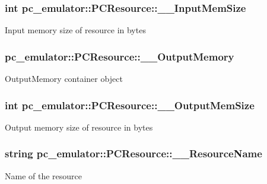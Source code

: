 \subsubsection[{\texorpdfstring{\+\_\+\+\_\+\+Input\+Mem\+Size}{__InputMemSize}}]{\setlength{\rightskip}{0pt plus 5cm}int pc\+\_\+emulator\+::\+P\+C\+Resource\+::\+\_\+\+\_\+\+Input\+Mem\+Size}\hypertarget{classpc__emulator_1_1PCResource_afb2356d0dcf4db0b6a04302861a26f18}{}\label{classpc__emulator_1_1PCResource_afb2356d0dcf4db0b6a04302861a26f18}
Input memory size of resource in bytes 
\subsubsection[{\texorpdfstring{\+\_\+\+\_\+\+Output\+Memory}{__OutputMemory}}]{ pc\+\_\+emulator\+::\+P\+C\+Resource\+::\+\_\+\+\_\+\+Output\+Memory}\hypertarget{classpc__emulator_1_1PCResource_aa70b08417c498d378158b048915ff8c0}{}\label{classpc__emulator_1_1PCResource_aa70b08417c498d378158b048915ff8c0}
Output\+Memory container object 
\subsubsection[{\texorpdfstring{\+\_\+\+\_\+\+Output\+Mem\+Size}{__OutputMemSize}}]{\setlength{\rightskip}{0pt plus 5cm}int pc\+\_\+emulator\+::\+P\+C\+Resource\+::\+\_\+\+\_\+\+Output\+Mem\+Size}\hypertarget{classpc__emulator_1_1PCResource_a9b24906c7b1fcaee0ce72018c75bae9f}{}\label{classpc__emulator_1_1PCResource_a9b24906c7b1fcaee0ce72018c75bae9f}
Output memory size of resource in bytes 
\subsubsection[{\texorpdfstring{\+\_\+\+\_\+\+Resource\+Name}{__ResourceName}}]{\setlength{\rightskip}{0pt plus 5cm}string pc\+\_\+emulator\+::\+P\+C\+Resource\+::\+\_\+\+\_\+\+Resource\+Name}\hypertarget{classpc__emulator_1_1PCResource_a2ef3a8a76df532cdb7d913ee83ff67c8}{}\label{classpc__emulator_1_1PCResource_a2ef3a8a76df532cdb7d913ee83ff67c8}
Name of the resource 
